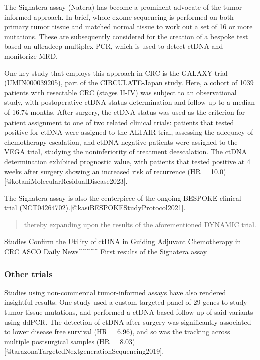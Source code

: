 \documentclass[
]{article}
\begin{document}
The Signatera assay (Natera) has become a prominent advocate of the
tumor-informed approach. In brief, whole exome sequencing is performed
on both primary tumor tissue and matched normal tissue to work out a set
of 16 or more mutations. These are subsequently considered for the
creation of a bespoke test based on ultradeep multiplex PCR, which is
used to detect ctDNA and monitorize MRD.

One key study that employs this approach in CRC is the GALAXY trial
(UMIN000039205), part of the CIRCULATE-Japan study. Here, a cohort of
1039 patients with resectable CRC (stages II-IV) was subject to an
observational study, with postoperative ctDNA status determination and
follow-up to a median of 16.74 months. After surgery, the ctDNA status
was used as the criterion for patient assignment to one of two related
clinical trials: patients that tested positive for ctDNA were assigned
to the ALTAIR trial, assessing the adequacy of chemotherapy escalation,
and ctDNA-negative patients were assigned to the VEGA trial, studying
the noninferiority of treatment deescalation. The ctDNA determination
exhibited prognostic value, with patients that tested positive at 4
weeks after surgery showing an increased risk of recurrence (HR = 10.0)
{[}@kotaniMolecularResidualDisease2023{]}.

The Signatera assay is also the centerpiece of the ongoing BESPOKE
clinical trial (NCT04264702).{[}@kasiBESPOKEStudyProtocol2021{]}.

\begin{quote}
thereby expanding upon the results of the aforementioned DYNAMIC trial.
\end{quote}

\href{https://dailynews.ascopubs.org/do/studies-confirm-utility-ctdna-guiding-adjuvant-chemotherapy-crc}{Studies
Confirm the Utility of ctDNA in Guiding Adjuvant Chemotherapy in CRC
\textbar{} ASCO Daily News}\^{}\^{}\^{}\^{}\^{} First results of the
Signatera assay

\subsubsection{Other trials}\label{other-trials}

Studies using non-commercial tumor-informed assays have also rendered
insightful results. One study used a custom targeted panel of 29 genes
to study tumor tissue mutations, and performed a ctDNA-based follow-up
of said variants using ddPCR. The detection of ctDNA after surgery was
significantly associated to lower disease free survival (HR = 6.96), and
so was the tracking across multiple postsurgical samples (HR = 8.03)
{[}@tarazonaTargetedNextgenerationSequencing2019{]}.
\end{document}
